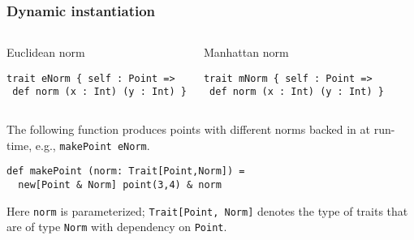 \documentclass{beamer}
\begin{document}
\begin{frame}[fragile]
  \frametitle{Dynamic instantiation}

  \begin{columns}[t]


\begin{exampleblock}{Euclidean norm}

\begin{lstlisting}
trait eNorm { self : Point =>
 def norm (x : Int) (y : Int) }
\end{lstlisting}


\end{exampleblock}


\begin{exampleblock}{Manhattan norm}

\begin{lstlisting}
trait mNorm { self : Point =>
 def norm (x : Int) (y : Int) }
\end{lstlisting}

\end{exampleblock}

  \end{columns}

\vskip10pt

\pause

The following function produces points with different norms backed in at
run-time, e.g., \lstinline{makePoint eNorm}.

  \begin{block}{}
\begin{lstlisting}
def makePoint (norm: Trait[Point,Norm]) =
  new[Point & Norm] point(3,4) & norm
\end{lstlisting}
  \end{block}

  \pause

  Here \lstinline{norm} is parameterized; \lstinline{Trait[Point, Norm]} denotes
  the type of traits that are of type \lstinline{Norm} with dependency on
  \lstinline{Point}.

\end{frame}
\end{document}
